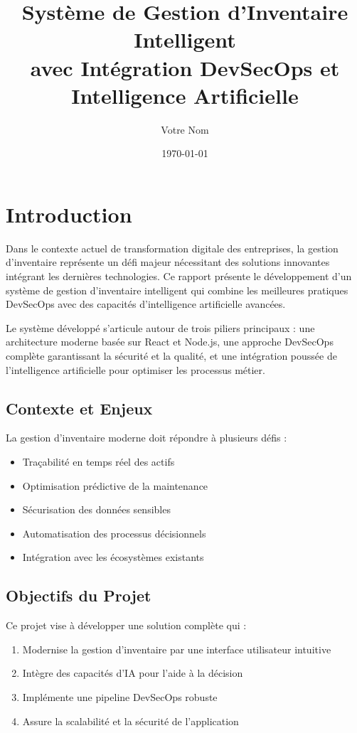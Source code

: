 \documentclass[12pt,a4paper]{report}
\title{\textbf{Système de Gestion d'Inventaire Intelligent\\avec Intégration DevSecOps et Intelligence Artificielle}}
\author{Votre Nom}
\date{\today}
\begin{document}
\maketitle

\tableofcontents
\newpage

\chapter{Introduction}

Dans le contexte actuel de transformation digitale des entreprises, la gestion d'inventaire représente un défi majeur nécessitant des solutions innovantes intégrant les dernières technologies. Ce rapport présente le développement d'un système de gestion d'inventaire intelligent qui combine les meilleures pratiques DevSecOps avec des capacités d'intelligence artificielle avancées.

Le système développé s'articule autour de trois piliers principaux : une architecture moderne basée sur React et Node.js, une approche DevSecOps complète garantissant la sécurité et la qualité, et une intégration poussée de l'intelligence artificielle pour optimiser les processus métier.

\section{Contexte et Enjeux}

La gestion d'inventaire moderne doit répondre à plusieurs défis :
\begin{itemize}
    \item Traçabilité en temps réel des actifs
    \item Optimisation prédictive de la maintenance
    \item Sécurisation des données sensibles
    \item Automatisation des processus décisionnels
    \item Intégration avec les écosystèmes existants
\end{itemize}

\section{Objectifs du Projet}

Ce projet vise à développer une solution complète qui :
\begin{enumerate}
    \item Modernise la gestion d'inventaire par une interface utilisateur intuitive
    \item Intègre des capacités d'IA pour l'aide à la décision
    \item Implémente une pipeline DevSecOps robuste
    \item Assure la scalabilité et la sécurité de l'application
\end{enumerate}
\end{document}

